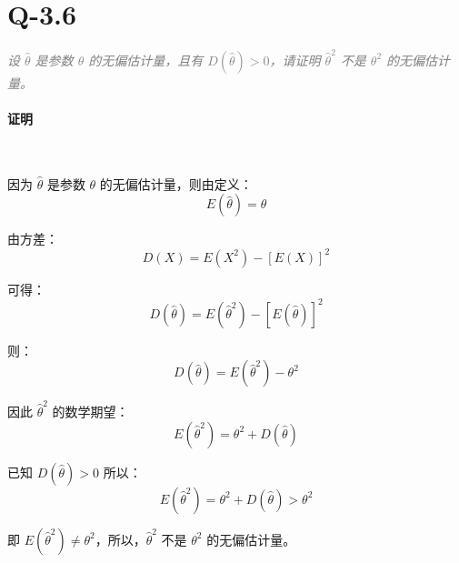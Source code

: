 \documentclass{article}
\begin{document}
\section{Q-3.6}
\textit{\textcolor{gray}{设 $\hat{\theta}$ 是参数 $\theta$ 的无偏估计量，且有 $D(\hat{\theta}) > 0$，请证明 $\hat{\theta}^2$ 不是 $\theta^2$ 的无偏估计量。}}

\paragraph*{证明}~{}

因为 $\hat{\theta}$ 是参数 $\theta$ 的无偏估计量，则由定义：
\[ E(\hat{\theta}) = \theta \]

由方差：
\[ D(X) = E(X^2) - [E(X)]^2 \]

可得：
\[ D(\hat{\theta}) = E(\hat{\theta}^2) - [E(\hat{\theta})]^2 \]

则：
\[ D(\hat{\theta}) = E(\hat{\theta}^2) - \theta^2 \]

因此 $\hat{\theta}^2$ 的数学期望：
\[ E(\hat{\theta}^2) = \theta^2 + D(\hat{\theta}) \]

已知 $D(\hat{\theta}) > 0$ 所以：
\[ E(\hat{\theta}^2) = \theta^2 + D(\hat{\theta}) > \theta^2 \]

即 $E(\hat{\theta}^2) \neq \theta^2$，所以，$\hat{\theta}^2$ 不是 $\theta^2$ 的无偏估计量。
\end{document}
